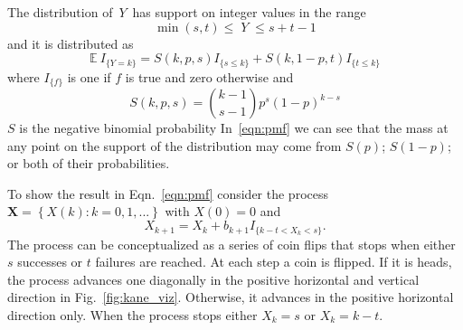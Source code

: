 \documentclass[12pt]{article}         %
\begin{document}
The distribution of $\,Y\,$ has support on integer values in the range 
\begin{equation*}               
     \min(s,t) \leq \; Y \;\leq s+t-1  \label{range.y.eq}
\end{equation*}
and it is distributed as
\begin{equation} \label{eqn:pmf}
\mathbb{E}\  I_{\{Y=k\}} = S(k, p, s) I_{\{s \leq k\}} + 
  S(k, 1-p, t) I_{\{ t \leq k \}}
\end{equation}
where $I_{\{f\}}$ is one if $f$ is true and zero otherwise and
\begin{equation} \label{eqn:N}
S(k, p, s) = {k-1 \choose s-1} p^s (1-p)^{k-s} 
\end{equation}
$S$ is the negative binomial probability 
In~\ref{eqn:pmf} we can see that the mass at 
any point on the support of the distribution may come from $S(p)$; $S(1-p)$;
or both of their probabilities. 



To show the result in Eqn.~\ref{eqn:pmf} consider the 
process $\mathbf{X} = \left\{X(k) : k = 0,1,... \right\}$ 
with $X(0)=0$ and
\begin{equation*} \label{eqn:proc}
X_{k+1} = X_k + b_{k+1} I_{\{ k-t < X_k < s\}}.
\end{equation*}
The process can be conceptualized as a series of coin 
flips that stops when either $s$ successes or $t$ failures are reached. 
At each step a coin is flipped. If it is heads, the process advances 
one diagonally in the 
positive horizontal and vertical direction in Fig.~\ref{fig:kane_viz}. 
Otherwise, it advances in the positive horizontal direction only. When the 
process stops either $X_k = s$ or $X_k = k-t$. 
\end{document}
